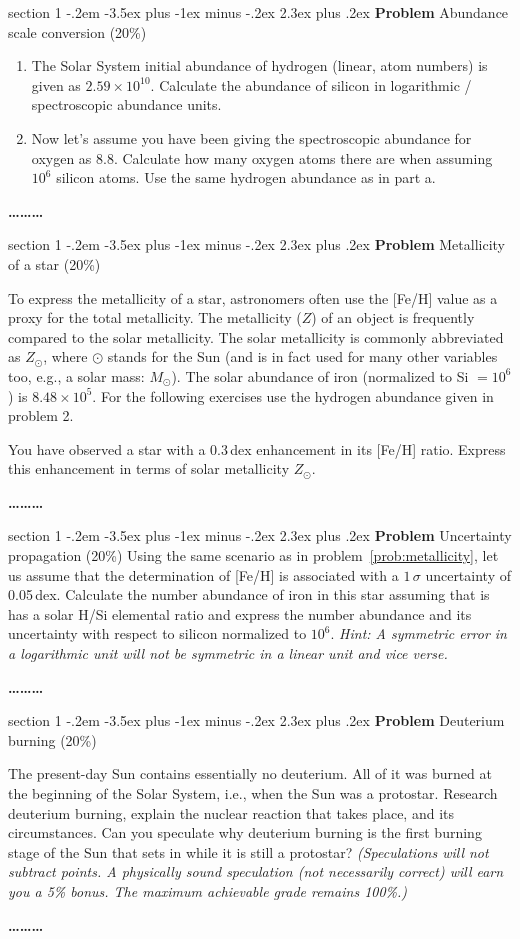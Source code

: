 \documentclass[letterpaper,12pt,twoside=false,DIV=13]{scrartcl}
\makeatletter
\newenvironment{problem}{\@startsection
    {section}
    {1}
    {-.2em}
    {-3.5ex plus -1ex minus -.2ex}
    {2.3ex plus .2ex}
    {
        \pagebreak[3] %
        \noindent\sffamily\bfseries Problem
    }
}
{
    \begin{center}\large\bfseries\ldots\ldots\ldots\end{center}
}
\makeatother
\begin{document}
\begin{problem}{Abundance scale conversion (20\%)}

\begin{enumerate}
    \item The Solar System initial abundance of hydrogen (linear, atom numbers) is given as $2.59 \times 10^{10}$. Calculate the abundance of silicon in logarithmic / spectroscopic abundance units.
    \item Now let's assume you have been giving the spectroscopic abundance for oxygen as 8.8. Calculate how many oxygen atoms there are when assuming $10^6$ silicon atoms. Use the same hydrogen abundance as in part a.
\end{enumerate}


\end{problem}

\begin{problem}{Metallicity of a star (20\%)}\label{prob:metallicity}

To express the metallicity of a star, astronomers often use the [Fe/H] value as a proxy for the total metallicity. The metallicity ($Z$) of an object is frequently compared to the solar metallicity. The solar metallicity is commonly abbreviated as $Z_\odot$, where $\odot$ stands for the Sun (and is in fact used for many other variables too, e.g., a solar mass: $M_\odot$). The solar abundance of iron (normalized to Si $=10^6$) is $8.48\times 10^5$. For the following exercises use the hydrogen abundance given in problem 2.

You have observed a star with a 0.3\,dex enhancement in its [Fe/H] ratio. Express this enhancement in terms of solar metallicity $Z_\odot$.

\end{problem}

\begin{problem}{Uncertainty propagation (20\%)}
Using the same scenario as in problem~\ref{prob:metallicity}, let us assume that the determination of [Fe/H] is associated with a $1\,\sigma$ uncertainty of 0.05\,dex. Calculate the number abundance of iron in this star assuming that is has a solar H/Si elemental ratio and express the number abundance and its uncertainty with respect to silicon normalized to $10^6$. \emph{Hint: A symmetric error in a logarithmic unit will not be symmetric in a linear unit and vice verse.} 
\end{problem}



\begin{problem}{Deuterium burning (20\%)}

The present-day Sun contains essentially no deuterium. All of it was burned at the beginning of the Solar System, i.e., when the Sun was a protostar. Research deuterium burning, explain the nuclear reaction that takes place, and its circumstances. Can you speculate why deuterium burning is the first burning stage of the Sun that sets in while it is still a protostar? \emph{(Speculations will not subtract points. A physically sound speculation (not necessarily correct) will earn you a 5\% bonus. The maximum achievable grade remains 100\%.)}

\end{problem}
\end{document}
